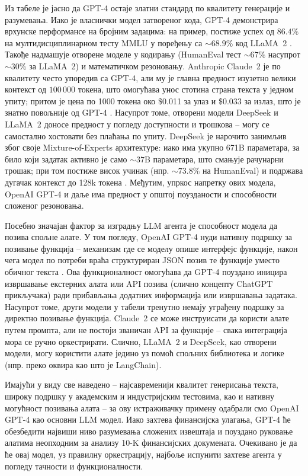Из табеле је јасно да GPT-4 остаје златни стандард по квалитету генерације и разумевања. Иако је власнички модел затвореног кода, GPT-4 демонстрира врхунске перформансе на бројним задацима: на пример, постиже успех од \(86.4\%\) на мултидисциплинарном тесту MMLU у поређењу са \(\sim68.9\%\) код LLaMA~2 \cite{cheung_llama2_vs_gpt4_2023}. Такође надмашује отворене моделе у кодирању (HumanEval тест \(\sim67\%\) насупрот \(\sim30\%\) за LLaMA~2) и математичком резоновању. Anthropic Claude~2 је по квалитету често упоредив са GPT-4, али му је главна предност изузетно велики контекст од \(100\,000\) токена, што омогућава унос стотина страна текста у једном упиту; притом је цена по 1000 токена око \$0.011 за улаз и \$0.033 за излаз, што је знатно повољније од GPT-4 \cite{anthropic_best_practices_2025}. Насупрот томе, отворени модели DeepSeek и LLaMA~2 доносе предност у погледу доступности и трошкова -- могу се самостално хостовати без плаћања по упиту. DeepSeek је нарочито занимљив због своје Mixture-of-Experts архитектуре: иако има укупно 671B параметара, за било који задатак активно је само \(\sim37\)B параметара, што смањује рачунарни трошак; при том постиже висок учинак (нпр. \(\sim73.8\%\) на HumanEval) и подржава дугачак контекст до 128k токена \cite{kramer_deepseek_2025}. Међутим, упркос напретку ових модела, OpenAI GPT-4 и даље има предност у општој поузданости и способности сложеног резоновања.

Посебно значајан фактор за изградњу LLM агента је способност модела да позива спољне алате. У том погледу, OpenAI GPT-4 нуди нативну подршку за позивање функција -- механизам где се моделу опише интерфејс функције, након чега модел по потреби враћа структуриран JSON позив те функције уместо обичног текста \cite{openai_function_calling_2023}. Ова функционалност омогућава да GPT-4 поуздано иницира извршавање екстерних алата или API позива (слично концепту ChatGPT прикључака) ради прибављања додатних информација или извршавања задатака. Насупрот томе, други модели у табели тренутно немају уграђену подршку за директно позивање функција. Claude~2 се може инструисати да користи алате путем промпта, али не постоји званичан API за функције -- свака интеграција мора се ручно оркестрирати. Слично, LLaMA~2 и DeepSeek, као отворени модели, могу користити алате једино уз помоћ спољних библиотека и логике (нпр. преко оквира као што је LangChain).

Имајући у виду све наведено -- најсавременији квалитет генерисања текста, широку подршку у академским и индустријским тестовима, као и нативну могућност позивања алата -- за ову истраживачку примену одабрали смо OpenAI GPT-4 као основни LLM модел. Иако захтева финансијска улагања, GPT-4 ће обезбедити највиши ниво разумевања сложених извештаја и поуздано руковање алатима неопходним за анализу 10-K финансијских докумената. Очекивано је да ће овај модел, уз правилну оркестрацију, најбоље испунити захтеве агента у погледу тачности и функционалности.


